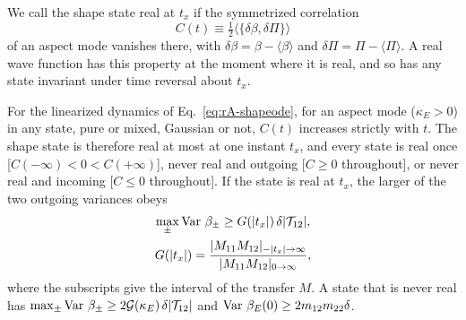 We call the shape state real at $t_x$ if the symmetrized correlation
\begin{equation}
C(t)\equiv\tfrac12\langle\{\delta\beta,\delta\Pi\}\rangle
\end{equation}
of an aspect mode vanishes there, with $\delta\beta=\beta-\langle\beta\rangle$ and $\delta\Pi=\Pi-\langle\Pi\rangle$.
A real wave function has this property at the moment where it is real, and so has any state invariant under time reversal about $t_x$.

\begin{rAtheorem}\label{thm:rA-real}
For the linearized dynamics of Eq.~\eqref{eq:rA-shapeode}, for an aspect mode ($\kappa_E>0$) in any state, pure or mixed, Gaussian or not, $C(t)$ increases strictly with $t$.
The shape state is therefore real at most at one instant $t_x$, and every state is real once [$C(-\infty)<0<C(+\infty)$], never real and outgoing [$C\geq0$ throughout], or never real and incoming [$C\leq0$ throughout].
If the state is real at $t_x$, the larger of the two outgoing variances obeys
\begin{equation}
\begin{gathered}
\max_\pm\operatorname{Var}\,\beta_\pm\geq G(|t_x|)\,\delta|\mathcal{T}_{12}|,\\
G(|t_x|)=\frac{|M_{11}M_{12}|_{-|t_x|\to\infty}}{|M_{11}M_{12}|_{0\to\infty}},
\end{gathered}
\label{eq:rA-Gtx}
\end{equation}
where the subscripts give the interval of the transfer $M$.
A state that is never real has $\max_\pm\operatorname{Var}\,\beta_\pm\geq2\mathcal{G}(\kappa_E)\,\delta|\mathcal{T}_{12}|$ and $\operatorname{Var}\,\beta_E(0)\geq2m_{12}m_{22}\delta$.
\end{rAtheorem}

